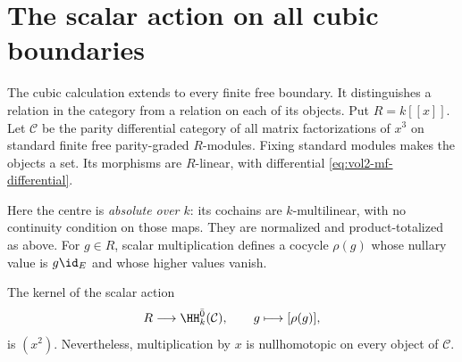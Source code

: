 \section{The scalar action on all cubic boundaries}
\label{sec:vol2-cubic-scalar-centre}

The cubic calculation extends to every finite free boundary.
It distinguishes a relation in the category from a relation on each
of its objects. Put $R=k[[x]]$. Let $\mathcal C$ be the
parity differential category of all matrix factorizations of $x^3$
on standard finite free parity-graded $R$-modules. Fixing standard
modules makes the objects a set. Its morphisms are $R$-linear,
with differential \eqref{eq:vol2-mf-differential}.

Here the centre is \emph{absolute over $k$}: its cochains are
$k$-multilinear, with no continuity condition on those maps.
They are normalized and product-totalized as above. For $g\in R$,
scalar multiplication defines a cocycle $\rho(g)$ whose nullary
value is $g\id_E$ and whose higher values vanish.

\begin{theorem}\label{thm:vol2-cubic-scalar-kernel}
The kernel of the scalar action
\[
 R\longrightarrow\HH_k^{\bar0}(\mathcal C),
 \qquad g\longmapsto[\rho(g)],
\]
is $(x^2)$. Nevertheless, multiplication by $x$ is nullhomotopic
on every object of $\mathcal C$.
\end{theorem}

